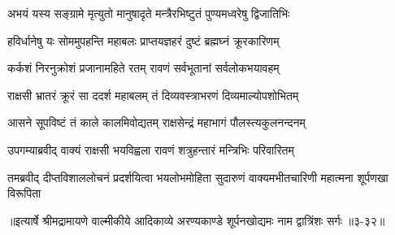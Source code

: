 \twolineshloka
{अभयं यस्य सङ्ग्रामे मृत्युतो मानुषादृते}
{मन्त्रैरभिष्टुतं पुण्यमध्वरेषु द्विजातिभिः} %

\twolineshloka
{हविर्धानेषु यः सोममुपहन्ति महाबलः}
{प्राप्तयज्ञहरं दुष्टं ब्रह्मघ्नं क्रूरकारिणम्} %

\twolineshloka
{कर्कशं निरनुक्रोशं प्रजानामहिते रतम्}
{रावणं सर्वभूतानां सर्वलोकभयावहम्} %

\twolineshloka
{राक्षसी भ्रातरं क्रूरं सा ददर्श महाबलम्}
{तं दिव्यवस्त्राभरणं दिव्यमाल्योपशोभितम्} %

\twolineshloka
{आसने सूपविष्टं तं काले कालमिवोद्यतम्}
{राक्षसेन्द्रं महाभागं पौलस्त्यकुलनन्दनम्} %

\twolineshloka
{उपगम्याब्रवीद् वाक्यं राक्षसी भयविह्वला}
{रावणं शत्रुहन्तारं मन्त्रिभिः परिवारितम्} %

\twolineshloka
{तमब्रवीद् दीप्तविशाललोचनं प्रदर्शयित्वा भयलोभमोहिता}
{सुदारुणं वाक्यमभीतचारिणी महात्मना शूर्पणखा विरूपिता} %


॥इत्यार्षे श्रीमद्रामायणे वाल्मीकीये आदिकाव्ये अरण्यकाण्डे शूर्पनखोद्यमः नाम द्वात्रिंशः सर्गः ॥३-३२॥
